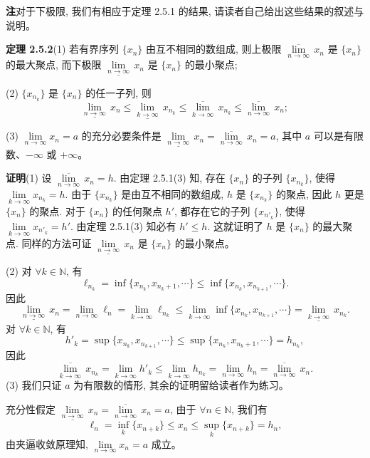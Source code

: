 \documentclass[UTF8,12pt,a4paper,fontset=fandol]{ctexart}
\begin{document}
\noindent\textbf{注}\quad 对于下极限, 我们有相应于定理 2.5.1 的结果, 请读者自己给出这些结果的叙述与说明。

\noindent\textbf{定理 2.5.2}\quad (1) 若有界序列 $\{x_n\}$ 由互不相同的数组成, 则上极限 $\overline{\lim\limits_{n\to\infty}}\,x_n$ 是 $\{x_n\}$ 的最大聚点, 而下极限 $\underline{\lim\limits_{n\to\infty}}\,x_n$ 是 $\{x_n\}$ 的最小聚点;

(2) $\{x_{n_k}\}$ 是 $\{x_n\}$ 的任一子列, 则
\[
  \underline{\lim_{n\to\infty}}\,x_n
  \leqslant
  \underline{\lim_{k\to\infty}}\,x_{n_k}
  \leqslant
  \overline{\lim_{k\to\infty}}\,x_{n_k}
  \leqslant
  \overline{\lim_{n\to\infty}}\,x_n;
\]

(3) $\lim\limits_{n\to\infty}x_n=a$ 的充分必要条件是 $\underline{\lim\limits_{n\to\infty}}\,x_n=\overline{\lim\limits_{n\to\infty}}\,x_n=a$, 其中 $a$ 可以是有限数、$-\infty$ 或 $+\infty$。

\noindent\textbf{证明}\quad (1) 设 $\overline{\lim\limits_{n\to\infty}}\,x_n=h$. 由定理 2.5.1(3) 知, 存在 $\{x_n\}$ 的子列 $\{x_{n_k}\}$, 使得 $\lim\limits_{k\to\infty}x_{n_k}=h$. 由于 $\{x_{n_k}\}$ 是由互不相同的数组成, $h$ 是 $\{x_{n_k}\}$ 的聚点, 因此 $h$ 更是 $\{x_n\}$ 的聚点. 对于 $\{x_n\}$ 的任何聚点 $h'$, 都存在它的子列 $\{x_{n'_k}\}$, 使得 $\lim\limits_{k\to\infty}x_{n'_k}=h'$. 由定理 2.5.1(3) 知必有 $h'\leqslant h$. 这就证明了 $h$ 是 $\{x_n\}$ 的最大聚点. 同样的方法可证 $\underline{\lim\limits_{n\to\infty}}\,x_n$ 是 $\{x_n\}$ 的最小聚点。

(2) 对 $\forall k\in\mathbb{N}$, 有
\[
  \ell_{n_k}=\inf\{x_{n_k},x_{n_k+1},\cdots\}
  \leqslant
  \inf\{x_{n_k},x_{n_{k+1}},\cdots\}.
\]
因此
\[
  \underline{\lim_{n\to\infty}}\,x_n
  =
  \lim_{n\to\infty}\ell_n
  =
  \lim_{k\to\infty}\ell_{n_k}
  \leqslant
  \lim_{k\to\infty}\inf\{x_{n_k},x_{n_{k+1}},\cdots\}
  =
  \underline{\lim_{k\to\infty}}\,x_{n_k}.
\]
对 $\forall k\in\mathbb{N}$, 有
\[
  h'_k=\sup\{x_{n_k},x_{n_{k+1}},\cdots\}
  \leqslant
  \sup\{x_{n_k},x_{n_k+1},\cdots\}=h_{n_k},
\]
因此
\[
  \overline{\lim_{k\to\infty}}\,x_{n_k}
  =
  \lim_{k\to\infty}h'_k
  \leqslant
  \lim_{k\to\infty}h_{n_k}
  =
  \lim_{n\to\infty}h_n
  =
  \overline{\lim_{n\to\infty}}\,x_n.
\]
(3) 我们只证 $a$ 为有限数的情形, 其余的证明留给读者作为练习。

充分性\quad 假定 $\underline{\lim\limits_{n\to\infty}}\,x_n=\overline{\lim\limits_{n\to\infty}}\,x_n=a$, 由于 $\forall n\in\mathbb{N}$, 我们有
\[
  \ell_n=\inf_k\{x_{n+k}\}\leqslant x_n\leqslant\sup_k\{x_{n+k}\}=h_n,
\]
由夹逼收敛原理知, $\lim\limits_{n\to\infty}x_n=a$ 成立。
\end{document}
